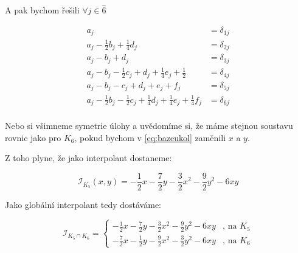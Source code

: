 \documentclass[../main.tex]{subfiles}
\begin{document}
A pak bychom řešili $\forall j \in \hat{6}$

\begin{align*}
    a_j &= \delta_{1j}\\
    a_j - \frac{1}{2}b_j + \frac{1}{4}d_j &= \delta_{2j}\\
    a_j -b_j +d_j &= \delta_{3j}\\
    a_j -b_j -\frac{1}{2}c_j +d_j +\frac{1}{4}e_j +\frac{1}{2} &= \delta_{4j}\\
    a_j -b_j-c_j+d_j+e_j+f_j &= \delta_{5j}\\
    a_j -\frac{1}{2}b_j -\frac{1}{2}c_j +\frac{1}{4}d_j + \frac{1}{4}e_j + \frac{1}{4}f_j&= \delta_{6j}\\
\end{align*}

Nebo si všimneme symetrie úlohy a uvědomíme si, že máme stejnou soustavu rovnic jako pro $K_6$, pokud bychom v \eqref{eq:bazeukol} zaměnili $x$ a $y$.

Z toho plyne, že jako interpolant dostaneme:

\begin{equation}\label{eq:interpolant2}
    \mathcal{I}_{K_5}(x,y) =  -\frac{1}{2}x -\frac{7}{2}y -\frac{3}{2}x^2-\frac{9}{2}y^2-6xy
\end{equation}


Jako globální interpolant tedy dostáváme:

\begin{equation}
    \mathcal{I}_{K_5\cap K_6} =\begin{cases}
        -\frac{1}{2}x -\frac{7}{2}y -\frac{3}{2}x^2-\frac{9}{2}y^2-6xy & \text{, na } K_5   \\
        -\frac{7}{2}x -\frac{1}{2}y -\frac{9}{2}x^2-\frac{3}{2}y^2-6xy & \text{, na } K_6
    \end{cases}
\end{equation}
\end{document}
